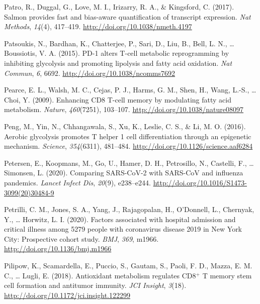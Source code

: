 \documentclass[12pt,twoside,openany,\mydriver]{thesis}  %
\begin{document}
\leavevmode\hypertarget{ref-patro_salmon_2017}{}%
Patro, R., Duggal, G., Love, M. I., Irizarry, R. A., \& Kingsford, C. (2017). Salmon provides fast and bias-aware quantification of transcript expression. \emph{Nat Methods}, \emph{14}(4), 417--419. \url{http://doi.org/10.1038/nmeth.4197}

\leavevmode\hypertarget{ref-patsoukis_pd-1_2015}{}%
Patsoukis, N., Bardhan, K., Chatterjee, P., Sari, D., Liu, B., Bell, L. N., \ldots{} Boussiotis, V. A. (2015). PD-1 alters T-cell metabolic reprogramming by inhibiting glycolysis and promoting lipolysis and fatty acid oxidation. \emph{Nat Commun}, \emph{6}, 6692. \url{http://doi.org/10.1038/ncomms7692}

\leavevmode\hypertarget{ref-pearce_enhancing_2009}{}%
Pearce, E. L., Walsh, M. C., Cejas, P. J., Harms, G. M., Shen, H., Wang, L.-S., \ldots{} Choi, Y. (2009). Enhancing CD8 T-cell memory by modulating fatty acid metabolism. \emph{Nature}, \emph{460}(7251), 103--107. \url{http://doi.org/10.1038/nature08097}

\leavevmode\hypertarget{ref-peng_aerobic_2016}{}%
Peng, M., Yin, N., Chhangawala, S., Xu, K., Leslie, C. S., \& Li, M. O. (2016). Aerobic glycolysis promotes T helper 1 cell differentiation through an epigenetic mechanism. \emph{Science}, \emph{354}(6311), 481--484. \url{http://doi.org/10.1126/science.aaf6284}

\leavevmode\hypertarget{ref-petersen_comparing_2020}{}%
Petersen, E., Koopmans, M., Go, U., Hamer, D. H., Petrosillo, N., Castelli, F., \ldots{} Simonsen, L. (2020). Comparing SARS-CoV-2 with SARS-CoV and influenza pandemics. \emph{Lancet Infect Dis}, \emph{20}(9), e238--e244. \url{http://doi.org/10.1016/S1473-3099(20)30484-9}

\leavevmode\hypertarget{ref-petrilli_factors_2020}{}%
Petrilli, C. M., Jones, S. A., Yang, J., Rajagopalan, H., O'Donnell, L., Chernyak, Y., \ldots{} Horwitz, L. I. (2020). Factors associated with hospital admission and critical illness among 5279 people with coronavirus disease 2019 in New York City: Prospective cohort study. \emph{BMJ}, \emph{369}, m1966. \url{http://doi.org/10.1136/bmj.m1966}

\leavevmode\hypertarget{ref-pilipow_antioxidant_2018}{}%
Pilipow, K., Scamardella, E., Puccio, S., Gautam, S., Paoli, F. D., Mazza, E. M. C., \ldots{} Lugli, E. (2018). Antioxidant metabolism regulates CD8\(^{\textrm{+}}\) T memory stem cell formation and antitumor immunity. \emph{JCI Insight}, \emph{3}(18). \url{http://doi.org/10.1172/jci.insight.122299}
\end{document}
